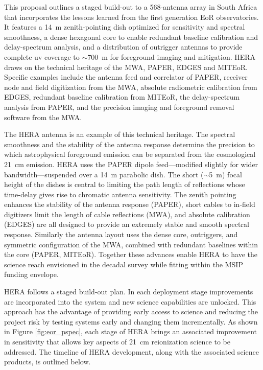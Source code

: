 \documentclass[preprint]{aastex}
\begin{document}
This proposal outlines a staged build-out to a 568-antenna array in South Africa that incorporates the lessons learned from the first generation EoR observatories. It features a 14~m zenith-pointing dish optimized for sensitivity and spectral smoothness, a dense hexagonal core to enable redundant baseline calibration and delay-spectrum analysis, and a distribution of outrigger antennas to provide complete uv coverage to $\sim$700~m for foreground imaging and mitigation. HERA draws on the technical heritage of the MWA, PAPER, EDGES and MITEoR. Specific examples include the antenna feed and correlator of PAPER, receiver node and field digitization from the MWA, absolute radiometric calibration from EDGES, redundant baseline calibration from MITEoR, the delay-spectrum analysis from PAPER, and the precision imaging and foreground removal software from the MWA.

The HERA antenna is an example of this technical heritage. The spectral smoothness and the stability of the antenna response determine the precision to which astrophysical foreground emission can be separated from the cosmological 21~cm emission. HERA uses the PAPER dipole feed---modified slightly for wider bandwidth---suspended over a 14~m parabolic dish. The short ($\sim$5~m) focal height of the dishes is central to limiting the path length of reflections whose time-delay gives rise to chromatic antenna sensitivity. The zenith pointing enhances the stability of the antenna response (PAPER), short cables to in-field digitizers limit the length of cable reflections (MWA), and absolute calibration (EDGES) are all designed to provide an extremely stable and smooth spectral response. Similarly the antenna layout uses the dense core, outriggers, and symmetric configuration of the MWA, combined with redundant baselines within the core (PAPER, MITEoR). Together these advances enable HERA to have the science reach envisioned in the decadal survey while fitting within the MSIP funding envelope.


HERA follows a staged build-out plan.  In
each deployment stage improvements are incorporated into the system and new
science capabilities are unlocked.  This approach has the advantage of
providing early access to science and reducing the project risk by testing systems
early and changing them incrementally.  As shown in Figure \ref{fig:eor_pspec}, each
stage of HERA brings an associated improvement in sensitivity that allows key
aspects of 21~cm reionization science to be addressed.  The timeline of HERA
development, along with the associated science products, is outlined below. 
\end{document}
